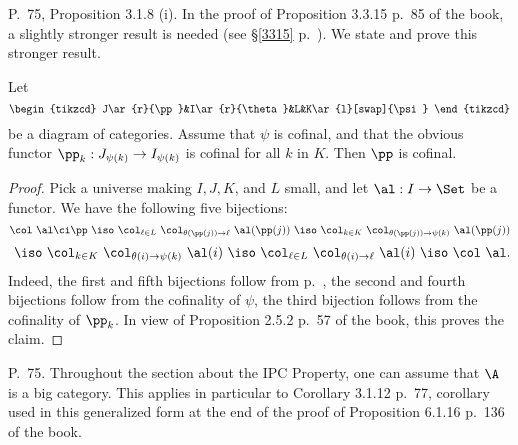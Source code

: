\documentclass[12pt]{article}
\theoremstyle{remark}
\theoremstyle{definition}
\begin{document}
\begin{s} 
P.~75, Proposition 3.1.8 (i). In the proof of Proposition 3.3.15 p.~85 of the book, a slightly stronger result is needed (see \S\ref{3315} p.~). We state and prove this stronger result. 
%
\begin{prop} 
%
Let 
$$
\begin{tikzcd}
J\ar{r}{\pp}&I\ar{r}{\theta}&L&K\ar{l}[swap]{\psi}
\end{tikzcd}
$$
be a diagram of categories. Assume that $\psi$ is cofinal, and that the obvious functor $\pp_k:J_{\psi(k)}\to I_{\psi(k)}$ is cofinal for all $k$ in $K$. Then $\pp$ is cofinal. 
%
\end{prop} 
%
\begin{proof}
Pick a universe making $I,J,K$, and $L$ small, and let $\al:I\to\Set$ be a functor. We have the following five bijections:
$$
\col\ \al\ci\pp\ \iso\ 
%
\col_{\ell\in L}\ \col_{\theta(\pp(j))\to\ell}\ \al(\pp(j))\ \iso\ 
%
\col_{k\in K}\ \col_{\theta(\pp(j))\to\psi(k)}\ \al(\pp(j))
$$
$$
\ \iso\ \col_{k\in K}\ \col_{\theta(i)\to\psi(k)}\ \al(i)\ \iso\ 
%
\col_{\ell\in L}\ \col_{\theta(i)\to\ell}\ \al(i)\ \iso\ 
%
\col\ \al.
$$
Indeed, the first and fifth bijections follow from  p.~, the second and fourth bijections follow from the cofinality of $\psi$, the third bijection follows from the cofinality of $\pp_k$. In view of Proposition 2.5.2 p.~57 of the book, this proves the claim.
\end{proof}
\end{s}

%

\begin{s}
P.~75. Throughout the section about the IPC Property, one can assume that $\A$ is a big category. This applies in particular to Corollary 3.1.12 p.~77, corollary used in this generalized form at the end of the proof of Proposition 6.1.16 p.~136 of the book.
\end{s}

%
\end{document}
